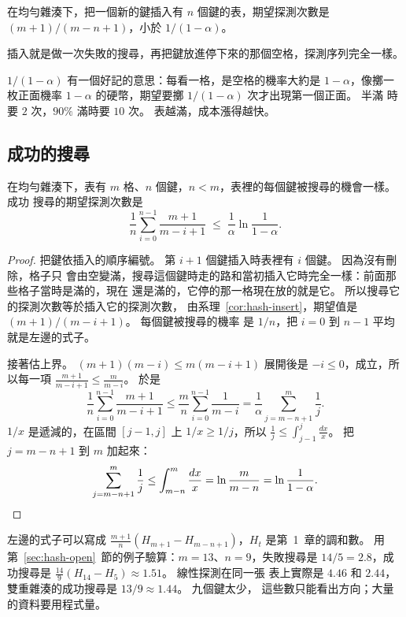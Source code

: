 \begin{corollary}
\label{cor:hash-insert}
在均勻雜湊下，把一個新的鍵插入有 $n$ 個鍵的表，期望探測次數是
$(m + 1)/(m - n + 1)$，小於 $1/(1 - \alpha)$。
\end{corollary}

插入就是做一次失敗的搜尋，再把鍵放進停下來的那個空格，探測序列完全一樣。

$1/(1 - \alpha)$ 有一個好記的意思：每看一格，是空格的機率大約是 $1 - \alpha$，像擲一
枚正面機率 $1 - \alpha$ 的硬幣，期望要擲 $1/(1 - \alpha)$ 次才出現第一個正面。 半滿
時要 $2$ 次，$90\%$ 滿時要 $10$ 次。 表越滿，成本漲得越快。

\subsection{成功的搜尋}

\begin{theorem}
\label{thm:hash-succ}
在均勻雜湊下，表有 $m$ 格、$n$ 個鍵，$n < m$，表裡的每個鍵被搜尋的機會一樣。 成功
搜尋的期望探測次數是
\[
\frac{1}{n} \sum_{i=0}^{n-1} \frac{m+1}{m-i+1}
\;\le\; \frac{1}{\alpha} \ln \frac{1}{1 - \alpha}.
\]
\end{theorem}

\begin{proof}
把鍵依插入的順序編號。 第 $i + 1$ 個鍵插入時表裡有 $i$ 個鍵。 因為沒有刪除，格子只
會由空變滿，搜尋這個鍵時走的路和當初插入它時完全一樣：前面那些格子當時是滿的，現在
還是滿的，它停的那一格現在放的就是它。 所以搜尋它的探測次數等於插入它的探測次數，
由系理~\ref{cor:hash-insert}，期望值是 $(m + 1)/(m - i + 1)$。 每個鍵被搜尋的機率
是 $1/n$，把 $i = 0$ 到 $n - 1$ 平均就是左邊的式子。

接著估上界。 $(m + 1)(m - i) \le m(m - i + 1)$ 展開後是 $-i \le 0$，成立，所以每一項
$\frac{m+1}{m-i+1} \le \frac{m}{m-i}$。 於是
\[
\frac{1}{n} \sum_{i=0}^{n-1} \frac{m+1}{m-i+1}
\le \frac{m}{n} \sum_{i=0}^{n-1} \frac{1}{m - i}
= \frac{1}{\alpha} \sum_{j = m-n+1}^{m} \frac{1}{j}.
\]
$1/x$ 是遞減的，在區間 $[j - 1, j]$ 上 $1/x \ge 1/j$，所以
$\frac{1}{j} \le \int_{j-1}^{j} \frac{dx}{x}$。 把 $j = m - n + 1$ 到 $m$ 加起來：
\[
\sum_{j=m-n+1}^{m} \frac{1}{j} \le \int_{m-n}^{m} \frac{dx}{x}
= \ln \frac{m}{m - n} = \ln \frac{1}{1 - \alpha}. \qedhere
\]
\end{proof}

左邊的式子可以寫成 $\frac{m+1}{n}(H_{m+1} - H_{m-n+1})$，$H_t$ 是第~1~章的調和數。
用第~\ref{sec:hash-open}~節的例子驗算：$m = 13$、$n = 9$，失敗搜尋是
$14/5 = 2.8$，成功搜尋是 $\frac{14}{9}(H_{14} - H_5) \approx 1.51$。 線性探測在同一張
表上實際是 $4.46$ 和 $2.44$，雙重雜湊的成功搜尋是 $13/9 \approx 1.44$。 九個鍵太少，
這些數只能看出方向；大量的資料要用程式量。

